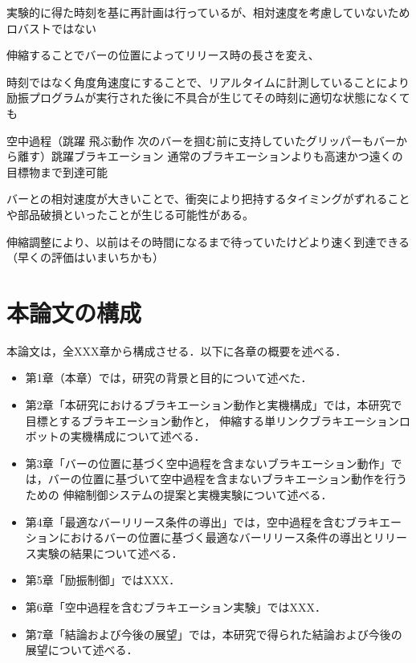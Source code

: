           実験的に得た時刻を基に再計画は行っているが、相対速度を考慮していないためロバストではない

          伸縮することでバーの位置によってリリース時の長さを変え、

          時刻ではなく角度角速度にすることで、リアルタイムに計測していることにより励振プログラムが実行された後に不具合が生じてその時刻に適切な状態になくても

          空中過程（跳躍 飛ぶ動作 次のバーを掴む前に支持していたグリッパーもバーから離す）跳躍ブラキエーション
          通常のブラキエーションよりも高速かつ遠くの目標物まで到達可能
          
          バーとの相対速度が大きいことで、衝突により把持するタイミングがずれることや部品破損といったことが生じる可能性がある。

          伸縮調整により、以前はその時間になるまで待っていたけどより速く到達できる（早くの評価はいまいちかも）


        \section{本論文の構成}

          本論文は，全XXX章から構成させる．以下に各章の概要を述べる．
          \begin{itemize}
            \item 第1章（本章）では，研究の背景と目的について述べた．
            \item 第2章「本研究におけるブラキエーション動作と実機構成」では，本研究で目標とするブラキエーション動作と，
            伸縮する単リンクブラキエーションロボットの実機構成について述べる．
            \item 第3章「バーの位置に基づく空中過程を含まないブラキエーション動作」では，バーの位置に基づいて空中過程を含まないブラキエーション動作を行うための
            伸縮制御システムの提案と実機実験について述べる．
            \item 第4章「最適なバーリリース条件の導出」では，空中過程を含むブラキエーションにおけるバーの位置に基づく最適なバーリリース条件の導出とリリース実験の結果について述べる．
            \item 第5章「励振制御」ではXXX．
            \item 第6章「空中過程を含むブラキエーション実験」ではXXX．
            \item 第7章「結論および今後の展望」では，本研究で得られた結論および今後の展望について述べる．
          \end{itemize}

